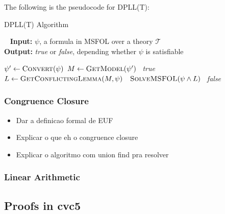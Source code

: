 The following is the pseudocode for DPLL(T):


\begin{algorithm}[H]
\caption{DPLL(T) Algorithm}~\label{dpllTAlgo}
\textbf{Input:} $\psi$, a formula in MSFOL over a theory  $\mathcal{T}$ \\
\textbf{Output:} \textit{true} or \textit{false}, depending whether $\psi$ is satisfiable
\begin{algorithmic}
\State $\psi' \gets \Call{Convert}{\psi}$ 
  \State $M \gets \Call{GetModel}{\psi'}$
   
    \State~\Return \textit{true}
  \Else
    \State $L \gets \Call{GetConflictingLemma}{M, \psi}$
    \State~\Return $\Call{SolveMSFOL}{\psi \wedge L}$
  \EndIf
\Else
  \State~\Return \textit{false}
\EndIf


\EndFunction
\end{algorithmic}
\end{algorithm}

\subsubsection{Congruence Closure}

\begin{itemize}
  \item Dar a definicao formal de EUF
  \item Explicar o que eh o congruence closure
  \item Explicar o algoritmo com union find pra resolver
\end{itemize}

\subsubsection{Linear Arithmetic}


\subsection{Proofs in cvc5}
